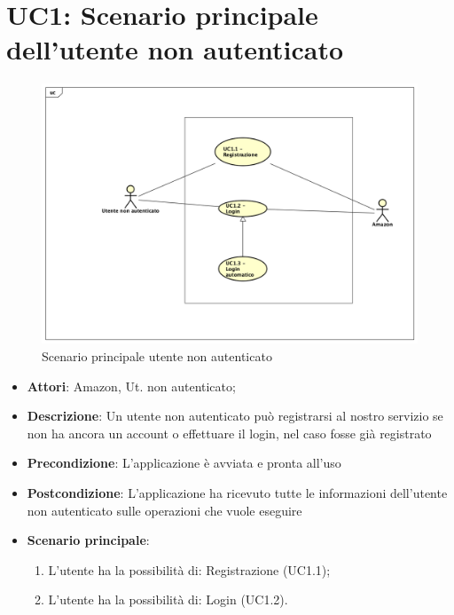 \section{UC1: Scenario principale dell'utente non autenticato}
\label{UC1}
\begin{figure}[h]
	\centering
	\includegraphics[scale=0.4]{Diagram/UC1.png}
	\caption{Scenario principale utente non autenticato}\label{}
\end{figure}
\begin{itemize}
	\item \textbf{Attori}: Amazon, Ut. non autenticato;
	\item \textbf{Descrizione}: Un utente non autenticato può registrarsi al nostro servizio se non ha ancora un account o effettuare il login, nel caso fosse già registrato
	\item \textbf{Precondizione}: L'applicazione è avviata e pronta all'uso
	\item \textbf{Postcondizione}: L'applicazione ha ricevuto tutte le informazioni dell'utente non autenticato sulle operazioni che vuole eseguire
	\item \textbf{Scenario principale}:
	\begin{enumerate} \item L'utente ha la possibilità di: Registrazione (UC1.1);  \item 
		L'utente ha la possibilità di: Login (UC1.2).\end{enumerate}
\end{itemize}

